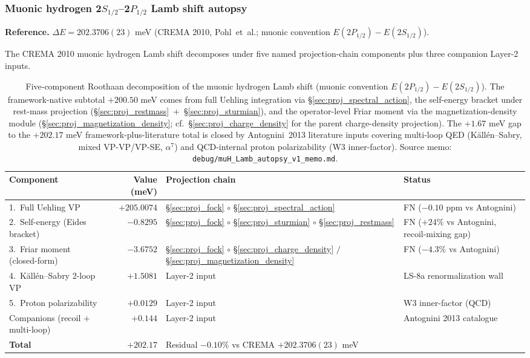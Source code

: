 \documentclass[11pt]{article}
\begin{document}
\subsubsection{Muonic hydrogen 2$S_{1/2}$--2$P_{1/2}$ Lamb shift autopsy}
\label{sec:autopsy_muh_lamb}

\textbf{Reference.} $\Delta E = 202.3706(23)$ meV (CREMA 2010,
Pohl~et~al.; muonic convention $E(2P_{1/2}) - E(2S_{1/2})$).

The CREMA 2010 muonic hydrogen Lamb shift decomposes under five
named projection-chain components plus three companion Layer-2
inputs.

\begin{table}[h!]
\centering\small
\caption{Five-component Roothaan decomposition of the muonic hydrogen
Lamb shift (muonic convention $E(2P_{1/2}) - E(2S_{1/2})$).  The
framework-native subtotal $+200.50$ meV comes from full Uehling
integration via \S\ref{sec:proj_spectral_action}, the self-energy
bracket under rest-mass projection
(\S\ref{sec:proj_restmass}~+~\S\ref{sec:proj_sturmian}), and the
operator-level Friar moment via the magnetization-density module
(\S\ref{sec:proj_magnetization_density}; cf.\
\S\ref{sec:proj_charge_density} for the parent charge-density
projection).  The $+1.67$ meV gap to the $+202.17$ meV
framework-plus-literature total is closed by Antognini~2013
literature inputs covering multi-loop QED (K\"all\'en--Sabry,
mixed VP-VP/VP-SE, $\alpha^7$) and QCD-internal proton
polarizability (W3 inner-factor).  Source memo:
\texttt{debug/muH\_Lamb\_autopsy\_v1\_memo.md}.}
\label{tab:autopsy_muh_lamb}
\begin{tabular}{p{4.5cm} r p{4.8cm} l}
\toprule
Component & Value (meV) & Projection chain & Status \\
\midrule
1.~Full Uehling VP & $+205.0074$ &
\S\ref{sec:proj_fock} $\circ$ \S\ref{sec:proj_spectral_action}
& FN ($-0.10$ ppm vs Antognini) \\
2.~Self-energy (Eides bracket) & $-0.8295$ &
\S\ref{sec:proj_fock} $\circ$ \S\ref{sec:proj_sturmian}
$\circ$ \S\ref{sec:proj_restmass}
& FN ($+24\%$ vs Antognini, recoil-mixing gap) \\
3.~Friar moment (closed-form) & $-3.6752$ &
\S\ref{sec:proj_fock} $\circ$ \S\ref{sec:proj_charge_density}
$/$ \S\ref{sec:proj_magnetization_density}
& FN ($-4.3\%$ vs Antognini) \\
4.~K\"all\'en--Sabry 2-loop VP & $+1.5081$ & Layer-2 input &
LS-8a renormalization wall \\
5.~Proton polarizability & $+0.0129$ & Layer-2 input &
W3 inner-factor (QCD) \\
Companions (recoil $+$ multi-loop) & $+0.144$ & Layer-2 input &
Antognini 2013 catalogue \\
\midrule
\textbf{Total} & $+202.17$ & \multicolumn{2}{l}{Residual $-0.10\%$
vs CREMA $+202.3706(23)$ meV} \\
\bottomrule
\end{tabular}
\end{table}
\end{document}
